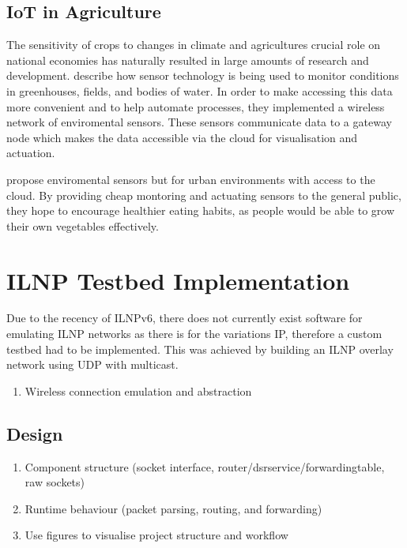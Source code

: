 \documentclass[12pt]{article}
\begin{document}
\subsection{IoT in Agriculture}

The sensitivity of crops to changes in climate and agricultures crucial role on national economies has naturally resulted in large amounts of research and development. \cite{agrisensor} describe how sensor technology is being used to monitor conditions in greenhouses, fields, and bodies of water. In order to make accessing this data more convenient and to help automate processes, they implemented a wireless network of enviromental sensors. These sensors communicate data to a gateway node which makes the data accessible via the cloud for visualisation and actuation. 

\cite{indoor} propose enviromental sensors but for urban environments with access to the cloud. By providing cheap montoring and actuating sensors to the general public, they hope to encourage healthier eating habits, as people would be able to grow their own vegetables effectively. 

\section{ILNP Testbed Implementation}

Due to the recency of ILNPv6, there does not currently exist software for emulating ILNP networks as there is for the variations IP, therefore a custom testbed had to be implemented. This was achieved by building an ILNP overlay network using UDP with multicast. 

\begin{enumerate}
    \item Wireless connection emulation and abstraction
\end{enumerate}

\subsection{Design}

\begin{enumerate}
\item Component structure (socket interface, router/dsrservice/forwardingtable, raw sockets)
\item Runtime behaviour (packet parsing, routing, and forwarding)
\item Use figures to visualise project structure and workflow
\end{enumerate}
\end{document}
